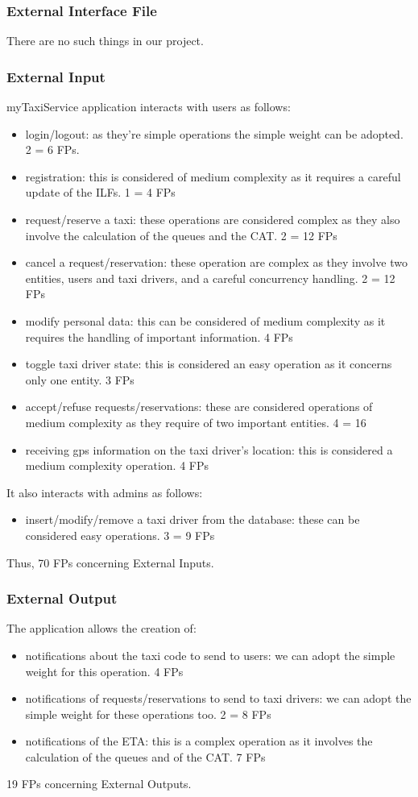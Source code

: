 \documentclass{article}
\begin{document}
\subsubsection{External Interface File}
There are no such things in our project.
\subsubsection{External Input}
myTaxiService application interacts with users
as follows: 
\begin{itemize}
	\item login/logout: as they're simple operations the simple weight can be adopted. 2 = 6 FPs.
	\item registration: this is considered of medium complexity as it requires a careful update of the ILFs. 1 = 4 FPs
	\item request/reserve a taxi: these operations are considered complex as they also involve the calculation of the queues and the CAT. 2 = 12 FPs
	\item cancel a request/reservation: these operation are complex as they involve two entities, users and taxi drivers, and a careful concurrency handling. 2 = 12 FPs
	\item modify personal data: this can be considered of medium complexity as it requires the handling of important information. 4 FPs
	\item toggle taxi driver state: this is considered an easy operation as it concerns only one entity. 3 FPs
	\item accept/refuse requests/reservations: these are considered operations of medium complexity as they require of two important entities. 4 = 16
	\item receiving gps information on the taxi driver's location: this is considered a medium complexity operation. 4 FPs
\end{itemize}
It also interacts with admins as follows:
\begin{itemize}
	\item insert/modify/remove a taxi driver from the database: these can be considered easy operations. 3 = 9 FPs
\end{itemize}
Thus, 70 FPs concerning External Inputs.

\subsubsection{External Output}
The application allows the creation of:
\begin{itemize}
	\item notifications about the taxi code to send to users: we can adopt the simple weight for this operation. 4 FPs
	\item notifications of requests/reservations to send to taxi drivers: we can adopt the simple weight for these operations too. 2 = 8 FPs
	\item notifications of the ETA: this is a complex operation as it involves the calculation of the queues and of the CAT. 7 FPs
\end{itemize}
19 FPs concerning External Outputs.
\end{document}
